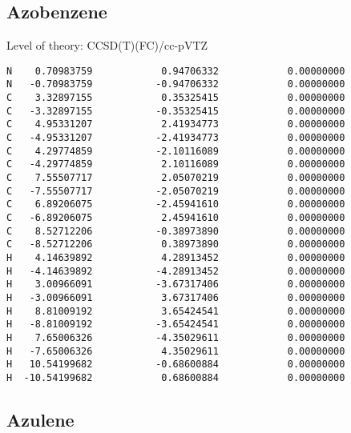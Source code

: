 \documentclass[journal=jctcce,manuscript=article,layout=traditional]{achemso}
\newcommand{\TZ}{cc-pVTZ}
\begin{document}
\subsection*{Azobenzene}

\begin{singlespace}
Level of theory: CCSD(T)(FC)/{\TZ}
\begin{verbatim}
N    0.70983759            0.94706332            0.00000000
N   -0.70983759           -0.94706332            0.00000000
C    3.32897155            0.35325415            0.00000000
C   -3.32897155           -0.35325415            0.00000000
C    4.95331207            2.41934773            0.00000000
C   -4.95331207           -2.41934773            0.00000000
C    4.29774859           -2.10116089            0.00000000
C   -4.29774859            2.10116089            0.00000000
C    7.55507717            2.05070219            0.00000000
C   -7.55507717           -2.05070219            0.00000000
C    6.89206075           -2.45941610            0.00000000
C   -6.89206075            2.45941610            0.00000000
C    8.52712206           -0.38973890            0.00000000
C   -8.52712206            0.38973890            0.00000000
H    4.14639892            4.28913452            0.00000000
H   -4.14639892           -4.28913452            0.00000000
H    3.00966091           -3.67317406            0.00000000
H   -3.00966091            3.67317406            0.00000000
H    8.81009192            3.65424541            0.00000000
H   -8.81009192           -3.65424541            0.00000000
H    7.65006326           -4.35029611            0.00000000
H   -7.65006326            4.35029611            0.00000000
H   10.54199682           -0.68600884            0.00000000
H  -10.54199682            0.68600884            0.00000000
\end{verbatim}
\end{singlespace}

\subsection*{Azulene}
\end{document}
